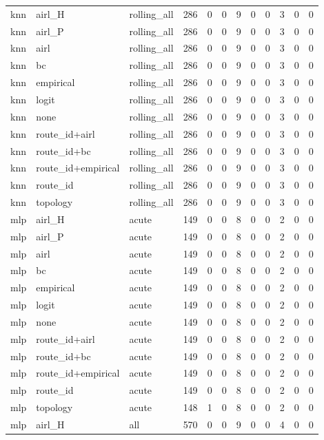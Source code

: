 \begin{tabular}{lllrrrrrrrrr}
knn & airl_H & rolling_all & 286 & 0 & 0 & 9 & 0 & 0 & 3 & 0 & 0 \\
knn & airl_P & rolling_all & 286 & 0 & 0 & 9 & 0 & 0 & 3 & 0 & 0 \\
knn & airl & rolling_all & 286 & 0 & 0 & 9 & 0 & 0 & 3 & 0 & 0 \\
knn & bc & rolling_all & 286 & 0 & 0 & 9 & 0 & 0 & 3 & 0 & 0 \\
knn & empirical & rolling_all & 286 & 0 & 0 & 9 & 0 & 0 & 3 & 0 & 0 \\
knn & logit & rolling_all & 286 & 0 & 0 & 9 & 0 & 0 & 3 & 0 & 0 \\
knn & none & rolling_all & 286 & 0 & 0 & 9 & 0 & 0 & 3 & 0 & 0 \\
knn & route_id+airl & rolling_all & 286 & 0 & 0 & 9 & 0 & 0 & 3 & 0 & 0 \\
knn & route_id+bc & rolling_all & 286 & 0 & 0 & 9 & 0 & 0 & 3 & 0 & 0 \\
knn & route_id+empirical & rolling_all & 286 & 0 & 0 & 9 & 0 & 0 & 3 & 0 & 0 \\
knn & route_id & rolling_all & 286 & 0 & 0 & 9 & 0 & 0 & 3 & 0 & 0 \\
knn & topology & rolling_all & 286 & 0 & 0 & 9 & 0 & 0 & 3 & 0 & 0 \\
mlp & airl_H & acute & 149 & 0 & 0 & 8 & 0 & 0 & 2 & 0 & 0 \\
mlp & airl_P & acute & 149 & 0 & 0 & 8 & 0 & 0 & 2 & 0 & 0 \\
mlp & airl & acute & 149 & 0 & 0 & 8 & 0 & 0 & 2 & 0 & 0 \\
mlp & bc & acute & 149 & 0 & 0 & 8 & 0 & 0 & 2 & 0 & 0 \\
mlp & empirical & acute & 149 & 0 & 0 & 8 & 0 & 0 & 2 & 0 & 0 \\
mlp & logit & acute & 149 & 0 & 0 & 8 & 0 & 0 & 2 & 0 & 0 \\
mlp & none & acute & 149 & 0 & 0 & 8 & 0 & 0 & 2 & 0 & 0 \\
mlp & route_id+airl & acute & 149 & 0 & 0 & 8 & 0 & 0 & 2 & 0 & 0 \\
mlp & route_id+bc & acute & 149 & 0 & 0 & 8 & 0 & 0 & 2 & 0 & 0 \\
mlp & route_id+empirical & acute & 149 & 0 & 0 & 8 & 0 & 0 & 2 & 0 & 0 \\
mlp & route_id & acute & 149 & 0 & 0 & 8 & 0 & 0 & 2 & 0 & 0 \\
mlp & topology & acute & 148 & 1 & 0 & 8 & 0 & 0 & 2 & 0 & 0 \\
mlp & airl_H & all & 570 & 0 & 0 & 9 & 0 & 0 & 4 & 0 & 0 \\

\end{tabular}
